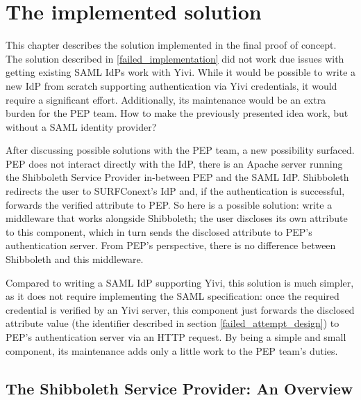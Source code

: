 \documentclass{report}
\begin{document}
\chapter{The implemented solution}
This chapter describes the solution implemented in the final proof of concept. The solution described in \ref{failed_implementation} did not work due issues with getting existing
SAML IdPs work with Yivi. While it would be possible to write a new IdP from scratch supporting authentication via Yivi credentials, it would require a significant effort.
Additionally, its maintenance would be an extra burden for the PEP team. How to make the previously presented idea work, but without a SAML identity provider? \par
After discussing possible solutions with the PEP team, a new possibility surfaced. PEP does not interact directly with the IdP, there is an Apache server running the Shibboleth Service
Provider in-between PEP and the SAML IdP. Shibboleth redirects the user to SURFConext's IdP and, if the authentication is successful, forwards the verified attribute to PEP. So
here is a possible solution: write a middleware that works alongside Shibboleth; the user discloses its own attribute to this component, which in turn sends the disclosed attribute
to PEP's authentication server. From PEP's perspective, there is no difference between Shibboleth and this middleware. \par
Compared to writing a SAML IdP supporting Yivi, this solution is much simpler, as it does not require implementing the SAML specification: once the required credential is verified
by an Yivi server, this component just forwards the disclosed attribute value (the identifier described in section \ref{failed_attempt_design}) to PEP's authentication server via
an HTTP request. By being a simple and small component, its maintenance adds only a little work to the PEP team's duties. 

\section{The Shibboleth Service Provider: An Overview}
\end{document}
